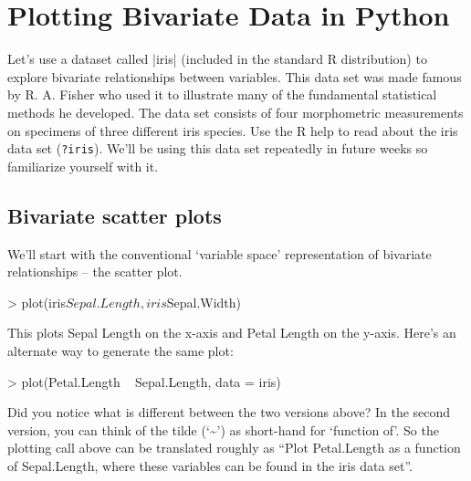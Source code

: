 \section{Plotting Bivariate Data in Python}


Let's use a dataset called |iris| (included in the standard R distribution) to explore bivariate relationships between variables. This data set was made famous by R. A. Fisher who used it to illustrate many of the fundamental statistical methods he developed. The data set consists of four morphometric measurements on specimens of three different iris species. Use the R help to read about the iris data set (\lstinline!?iris!). We'll be using this data set repeatedly in future weeks so familiarize yourself with it.
%


\subsection{Bivariate scatter plots}
We'll start with the conventional `variable space' representation of bivariate relationships -- the scatter plot.
%
\begin{R}
> plot(iris$Sepal.Length, iris$Sepal.Width)
\end{R}
%
This plots Sepal Length on the x-axis and Petal Length on the y-axis. Here's an alternate way to generate the same plot:
%
\begin{R}
> plot(Petal.Length ~ Sepal.Length, data = iris)
\end{R}
%
Did you notice what is different between the two versions above?  In the second version, you can think of the tilde (`\textasciitilde') as short-hand for `function of'.  So the plotting call above can be translated roughly as ``Plot Petal.Length as a function of Sepal.Length, where these variables can be found in the iris data set''.

